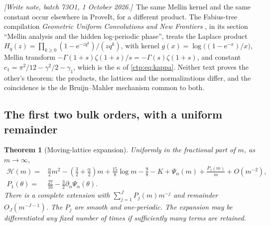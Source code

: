 \documentclass[11pt,a4paper]{article}
\numberwithin{equation}{section}
\newtheorem{theorem}{Theorem}[section]
\theoremstyle{definition}
\theoremstyle{remark}
\newcommand{\e}{\mathrm e}
\newcommand{\HH}{\mathcal H}
\newcommand{\writenote}[1]{\par\smallskip\noindent
 \textit{[Write note, batch 73O1, 1 October 2026.]}\ #1\par\smallskip}
\begin{document}
\writenote{The same Mellin kernel and the same constant occur elsewhere
in ProveIt, for a different product. The Fabius-tree compilation
\emph{Geometric Uniform Convolutions and New Frontiers}
\cite{fabiusH}, in its section ``Mellin analysis and the hidden
log-periodic phase'', treats the Laplace product
$H_q(z)=\prod_{k\ge0}(1-\e^{-zq^k})/(zq^k)$, with kernel
$g(x)=\log\bigl((1-\e^{-x})/x\bigr)$, Mellin transform
$-\Gamma(1+s)\zeta(1+s)/s=-\Gamma(s)\zeta(1+s)$, and constant
$c_1=\pi^2/12-\gamma^2/2-\gamma_1$, which is the $\kappa$ of
\eqref{ctp:eq:kappa}. Neither text proves the other's theorem: the
products, the lattices and the normalizations differ, and the
coincidence is the de Bruijn--Mahler mechanism common to both.}

\subsection{The first two bulk orders, with a uniform remainder}
\begin{theorem}[Moving-lattice expansion]\label{ctp:thm:H}
Uniformly in the fractional part of $m$, as $m\to\infty$,
\begin{align}
 \HH(m)={}&\frac\alpha2m^2-
 \left(\frac32+\frac\alpha2\right)m+
 \frac{15}{8}\log m-\frac98-K+\Psi_\alpha(m)
 +\frac{P_1(m)}m+O(m^{-2}),\label{ctp:eq:H-expansion}\\
 P_1(\theta)={}&\frac{27}{16}-\frac32\partial_\alpha\Psi_\alpha(\theta).
 \label{ctp:eq:P1}
\end{align}
There is a complete extension with $\sum_{j=1}^J P_j(m)m^{-j}$ and
remainder $O_J(m^{-J-1})$. The $P_j$ are smooth and one-periodic. The
expansion may be differentiated any fixed number of times if sufficiently
many terms are retained.
\end{theorem}
\end{document}
